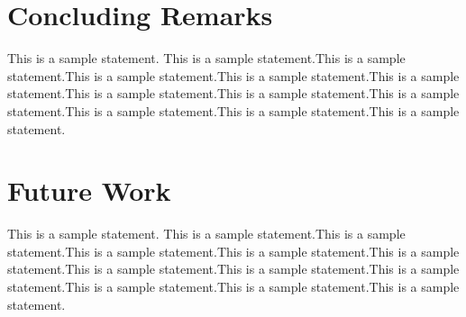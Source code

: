 \documentclass[12pt]{report}
\begin{document}
\section{Concluding Remarks}
This is a sample statement. This is a sample statement.This is a sample statement.This is a sample statement.This is a sample statement.This is a sample statement.This is a sample statement.This is a sample statement.This is a sample statement.This is a sample statement.This is a sample statement.This is a sample statement.

\section{Future Work}
This is a sample statement. This is a sample statement.This is a sample statement.This is a sample statement.This is a sample statement.This is a sample statement.This is a sample statement.This is a sample statement.This is a sample statement.This is a sample statement.This is a sample statement.This is a sample statement.


 
 
\end{document}
